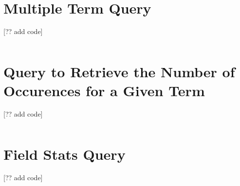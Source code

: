 \section{Multiple Term Query}
[?? add code]
\begin{lstlisting}[language={java}, caption={Java code used to search for multiple terms.}, label={ap:multiple-term-query}]

\end{lstlisting}

\section{Query to Retrieve the Number of Occurences for a Given Term}
[?? add code]
\begin{lstlisting}[language={java}, caption={Java code used retrieve the number of occurences for a given term in the collection.}, label={ap:number-of-occurences-query}]

\end{lstlisting}

\section{Field Stats Query}
[?? add code]
\begin{lstlisting}[language={java}, caption={Java code used retrieve the total number of terms in a field in the collection.}, label={ap:field-stasts-query}]

\end{lstlisting}
